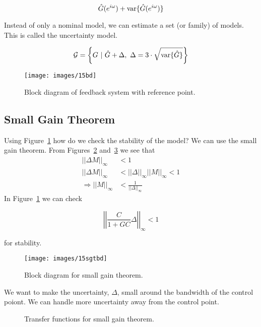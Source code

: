 \begin{equation*}
\hat{G}(e^{i\omega}) + \text{var}\{\hat{G}(e^{i\omega})\}
\end{equation*}

Instead of only a nominal model, we can estimate a set (or family) of models.
This is called the uncertainty model.

\begin{equation*}
\mathcal{G} = \left\lbrace G~|~\hat{G}+\Delta,~\Delta=3\cdot\sqrt{\text{var}\{\hat{G}\}}\right\rbrace
\end{equation*}

\begin{figure}[ht!]
\centering
\texttt{[image: images/15bd]}
\caption{Block diagram of feedback system with reference point.}%
\label{fig:15bd}
\end{figure}

\subsection{Small Gain Theorem}%
\label{sec:15sgt}
Using Figure~\ref{fig:15bd} how do we check the stability of the model?
We can use the small gain theorem.
From Figures~\ref{fig:15sgtbd} and~\ref{fig:15sgt} we see that
\begin{align*}
||\Delta M||_\infty &< 1 \\
||\Delta M||_\infty &< ||\Delta||_\infty||M||_\infty < 1 \\
\Rightarrow ||M||_\infty &< \frac{1}{||\Delta||_\infty}
\end{align*}
In Figure~\ref{fig:15bd} we can check

\begin{equation*}
\left|\left|\frac{C}{1+GC}\Delta\right|\right|_\infty < 1
\end{equation*}

for stability.

\begin{figure}[ht!]
\centering
\texttt{[image: images/15sgtbd]}
\caption{Block diagram for small gain theorem.}%
\label{fig:15sgtbd}
\end{figure}

We want to make the uncertainty, $\Delta$, small around the bandwidth of the control poiont.
We can handle more uncertainty away from the control point.

\begin{figure}[ht!]
\centering
{} \hfill
{}
\caption{Transfer functions for small gain theorem.}%
\label{fig:15sgt}
\end{figure}
